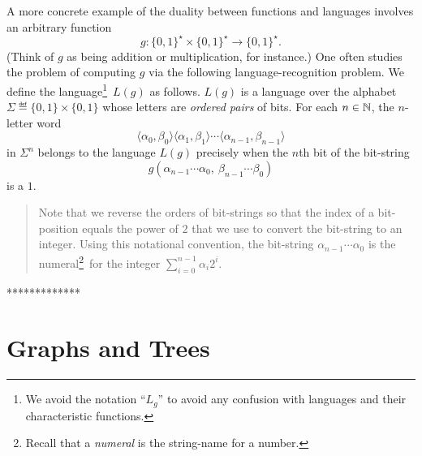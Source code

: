 \documentclass{article}
\begin{document}
{A more concrete example of the duality between functions and languages
involves an arbitrary function
\begin{equation}
\label{e.sample-g}
g: \{ 0,1 \}^\star \times \{ 0,1 \}^\star \rightarrow \{ 0,1 \}^\star.
\end{equation}
(Think of $g$ as being addition or multiplication, for instance.)  One
often studies the problem of computing $g$ via the following
language-recognition problem.  We define the language\footnote{We
  avoid the notation ``$L_g$'' to avoid any confusion with languages
  and their characteristic functions.}~$L(g)$ as follows.  $L(g)$ is a
language over the alphabet $\Sigma \eqdef \{ 0,1 \} \times \{ 0,1 \}$
whose letters are {\em ordered pairs} of bits.  For each $n \in \mathbb{N}$,
the $n$-letter word
\[ \langle \alpha_0, \beta_0 \rangle \langle \alpha_1, \beta_1
   \rangle \cdots \langle \alpha_{n-1}, \beta_{n-1} \rangle \]
in $\Sigma^n$ belongs to the language $L(g)$ precisely when the $n$th
bit of the bit-string 
\[ g(\alpha_{n-1} \cdots \alpha_0, \ \beta_{n-1} \cdots \beta_0) \]
is a $1$.
\begin{quote}
Note that we reverse the orders of bit-strings so that the index of a
bit-position equals the power of $2$ that we use to convert the
bit-string to an integer.  Using this notational convention, the
bit-string $\alpha_{n-1} \cdots \alpha_0$ is the
numeral\footnote{Recall that a {\em numeral\/} is the string-name
for a number.}~for the integer $\sum_{i=0}^{n-1} \alpha_i 2^i$.
\end{quote}
*************}

\section{Graphs and Trees}
\label{s.graphs+trees}
\end{document}
